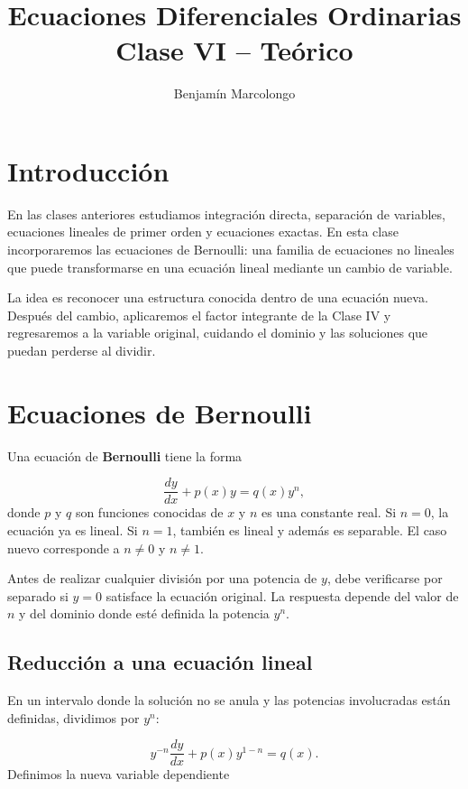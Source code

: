 \documentclass[12pt,a4paper]{article}
\title{Ecuaciones Diferenciales Ordinarias\\Clase VI -- Teórico}
\author{Benjamín Marcolongo}
\date{}
\begin{document}
	\maketitle

	\section*{Introducción}

	En las clases anteriores estudiamos integración directa, separación de variables, ecuaciones lineales de primer orden y ecuaciones exactas. En esta clase incorporaremos las ecuaciones de Bernoulli: una familia de ecuaciones no lineales que puede transformarse en una ecuación lineal mediante un cambio de variable.

	La idea es reconocer una estructura conocida dentro de una ecuación nueva. Después del cambio, aplicaremos el factor integrante de la Clase IV y regresaremos a la variable original, cuidando el dominio y las soluciones que puedan perderse al dividir.

	\clearpage

	\section{Ecuaciones de Bernoulli}

	Una ecuación de \textbf{Bernoulli} tiene la forma

	\[
	\boxed{
	\frac{dy}{dx}+p(x)y=q(x)y^n,
	}
	\]
	donde \(p\) y \(q\) son funciones conocidas de \(x\) y \(n\) es una constante real. Si \(n=0\), la ecuación ya es lineal. Si \(n=1\), también es lineal y además es separable. El caso nuevo corresponde a \(n\neq0\) y \(n\neq1\).

	Antes de realizar cualquier división por una potencia de \(y\), debe verificarse por separado si \(y=0\) satisface la ecuación original. La respuesta depende del valor de \(n\) y del dominio donde esté definida la potencia \(y^n\).

	\subsection{Reducción a una ecuación lineal}

	En un intervalo donde la solución no se anula y las potencias involucradas están definidas, dividimos por \(y^n\):

	\[
	y^{-n}\frac{dy}{dx}+p(x)y^{1-n}=q(x).
	\]
	Definimos la nueva variable dependiente
\end{document}
